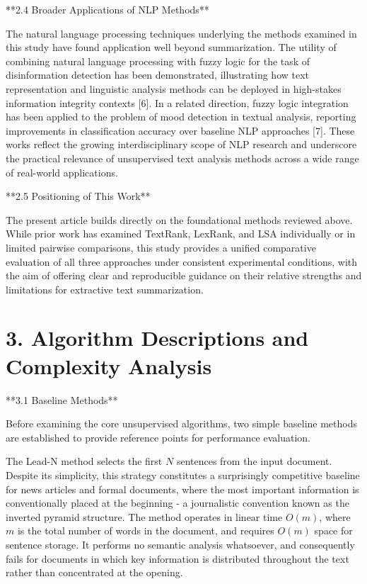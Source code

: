 \documentclass[10pt]{book}
\begin{document}
**2.4 Broader Applications of NLP Methods**

The natural language processing techniques underlying the methods examined in this study have found application well beyond summarization. The utility of combining natural language processing with fuzzy logic for the task of disinformation detection has been demonstrated, illustrating how text representation and linguistic analysis methods can be deployed in high-stakes information integrity contexts [6]. In a related direction, fuzzy logic integration has been applied to the problem of mood detection in textual analysis, reporting improvements in classification accuracy over baseline NLP approaches [7]. These works reflect the growing interdisciplinary scope of NLP research and underscore the practical relevance of unsupervised text analysis methods across a wide range of real-world applications.

**2.5 Positioning of This Work**

The present article builds directly on the foundational methods reviewed above. While prior work has examined TextRank, LexRank, and LSA individually or in limited pairwise comparisons, this study provides a unified comparative evaluation of all three approaches under consistent experimental conditions, with the aim of offering clear and reproducible guidance on their relative strengths and limitations for extractive text summarization.

\section{3. Algorithm Descriptions and Complexity Analysis}

**3.1 Baseline Methods**

Before examining the core unsupervised algorithms, two simple baseline methods are established to provide reference points for performance evaluation.

The Lead-N method selects the first $N$ sentences from the input document. Despite its simplicity, this strategy constitutes a surprisingly competitive baseline for news articles and formal documents, where the most important information is conventionally placed at the beginning - a journalistic convention known as the inverted pyramid structure. The method operates in linear time $O(m)$, where $m$ is the total number of words in the document, and requires $O(m)$ space for sentence storage. It performs no semantic analysis whatsoever, and consequently fails for documents in which key information is distributed throughout the text rather than concentrated at the opening.
\end{document}
